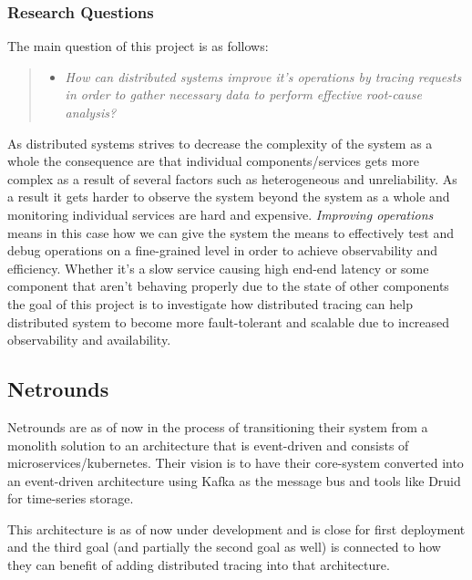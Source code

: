 \documentclass[10pt, titlepage, oneside, a4paper]{article}
\begin{document}
\subsubsection{Research Questions}

The main question of this project is as follows:

\begin{quote}
    
    \begin{itemize}
        \item \textit{How can distributed systems improve it's operations by tracing requests in order to gather necessary data to perform effective root-cause analysis?}
    \end{itemize}
\end{quote}

As distributed systems strives to decrease the complexity of the system as a whole the consequence are that individual components/services gets more complex as a result of several factors such as heterogeneous and unreliability. As a result it gets harder to observe the system beyond the system as a whole and monitoring individual services are hard and expensive. \textit{Improving operations} means in this case how we can give the system the means to effectively test and debug operations on a fine-grained level in order to achieve observability and efficiency. Whether it's a slow service causing high end-end latency or some component that aren't behaving properly due to the state of other components the goal of this project is to investigate how distributed tracing can help distributed system to become more fault-tolerant and scalable due to increased observability and availability.





\subsection{Netrounds}

Netrounds are as of now in the process of transitioning their system from a monolith solution to an architecture that is event-driven and consists of microservices/kubernetes. Their vision is to have their core-system converted into an event-driven architecture using Kafka as the message bus and tools like Druid for time-series storage. 

This architecture is as of now under development and is close for first deployment and the third goal (and partially the second goal as well) is connected to how they can benefit of adding distributed tracing into that architecture.
\end{document}
